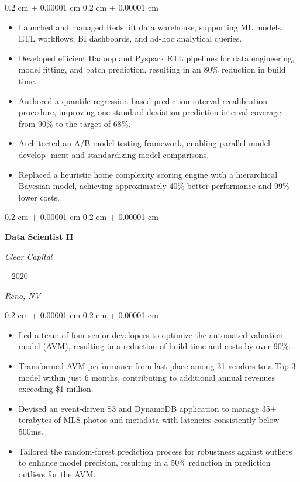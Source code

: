 \documentclass[11pt, letterpaper]{article}
\newenvironment{highlights}{
    \begin{itemize}[
        topsep=0.10 cm,
        parsep=0.10 cm,
        partopsep=0pt,
        itemsep=0pt,
        leftmargin=0.4 cm + 10pt
    ]
}{
    \end{itemize}
} %
\newenvironment{onecolentry}{
    \begin{adjustwidth}{
        0.2 cm + 0.00001 cm
    }{
        0.2 cm + 0.00001 cm
    }
}{
    \end{adjustwidth}
} %
\newenvironment{twocolentry}[2][]{
    \onecolentry
    \def\secondColumn{#2}
    \setcolumnwidth{\fill, 4.5 cm}
    \begin{paracol}{2}
}{
    \switchcolumn \raggedleft \secondColumn
    \end{paracol}
    \endonecolentry
} %
\begin{document}
\begin{onecolentry}
    \begin{highlights}

        \item Launched and managed Redshift data warehouse, supporting ML models, ETL
        workﬂows, BI dashboards, and ad-hoc analytical queries.
        \item Developed eﬃcient Hadoop and Pyspark ETL pipelines for data engineering,
        model ﬁtting, and batch prediction, resulting in an 80\% reduction in build time.
        \item Authored a quantile-regression based prediction interval recalibration procedure, improving
        one standard deviation prediction interval coverage from 90\% to the target of 68\%.
        \item Architected an A/B model testing framework, enabling parallel model develop-
        ment and standardizing model comparisons.
        \item Replaced a heuristic home complexity scoring engine with a hierarchical Bayesian model,
        achieving approximately 40\% better performance and 99\% lower costs.

    \end{highlights}
\end{onecolentry}

\vspace{0.2 cm}
\begin{twocolentry}{
        2017 – 2020

        \textit{Reno, NV}
    }
    \textbf{Data Scientist II}

    \textit{Clear Capital}
\end{twocolentry}

\begin{onecolentry}
    \begin{highlights}

        \item Led a team of four senior developers to optimize the automated valuation
        model (AVM), resulting in a reduction of build time and costs by over 90\%.
        \item  Transformed AVM performance from last place among 31 vendors to a Top
        3 model within just 6 months, contributing to additional annual revenues
        exceeding \$1 million.
        \item Devised an event-driven S3 and DynamoDB application to manage 35+ terabytes
        of MLS photos and metadata with latencies consistently below 500ms.
        \item Tailored the random-forest prediction process for robustness against outliers to
         enhance model precision, resulting in a 50\% reduction in prediction outliers for the AVM.

    \end{highlights}
\end{onecolentry}
\end{document}
